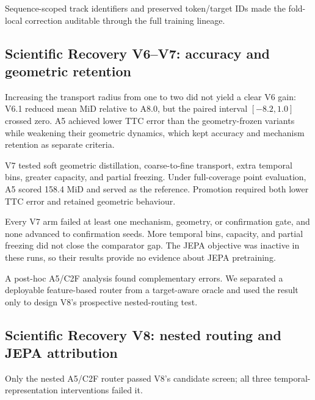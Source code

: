 Sequence-scoped track identifiers and preserved token/target IDs made the fold-local correction auditable through the full training lineage.

\subsection{Scientific Recovery V6--V7: accuracy and geometric retention}

Increasing the transport radius from one to two did not yield a clear V6 gain: V6.1 reduced mean MiD relative to A8.0, but the paired interval $[-8.2,1.0]$ crossed zero. A5 achieved lower TTC error than the geometry-frozen variants while weakening their geometric dynamics, which kept accuracy and mechanism retention as separate criteria. 

V7 tested soft geometric distillation, coarse-to-fine transport, extra temporal bins, greater capacity, and partial freezing. Under full-coverage point evaluation, A5 scored 158.4 MiD and served as the reference. Promotion required both lower TTC error and retained geometric behaviour. 

\begin{table}[htbp]
\centering\small

\caption{V7 full-coverage MiD relative to A5, using seed 7 and three outer folds.}
\label{tab:early-v7}
\end{table}

Every V7 arm failed at least one mechanism, geometry, or confirmation gate, and none advanced to confirmation seeds. More temporal bins, capacity, and partial freezing did not close the comparator gap. The JEPA objective was inactive in these runs, so their results provide no evidence about JEPA pretraining. 

A post-hoc A5/C2F analysis found complementary errors. We separated a deployable feature-based router from a target-aware oracle and used the result only to design V8's prospective nested-routing test.

\subsection{Scientific Recovery V8: nested routing and JEPA attribution}

Only the nested A5/C2F router passed V8's candidate screen; all three temporal-representation interventions failed it. 

